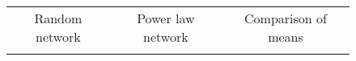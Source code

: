 \documentclass[12pt]{article}
\begin{document}
\begin{figure}[ht!]
\begin{footnotesize}
\begin{center}%
\hspace*{-0.5cm}%
\begin{tabular}
[c]{ccc}%
Random network & Power law network & Comparison of means%
\vspace{0.1cm}%
\\%
{\includegraphics[
height=1.7071in,
width=2.1283in
]%
{figs/theory_ER_N10000_dcT.png}%
}
&
{\includegraphics[
height=1.7071in,
width=2.1283in
]%
{figs/theory_PL_N10000_dcT.png}%
}
&
{\includegraphics[
trim=0.000000in -0.417660in 0.000000in 0.306138in,
height=1.6431in,
width=2.1283in
]%
{figs/theory_cmp_ER_PL.png}%
}
\vspace{0.1cm}%
\end{tabular}




\end{center}
\end{footnotesize}
\end{figure}
\end{document}

